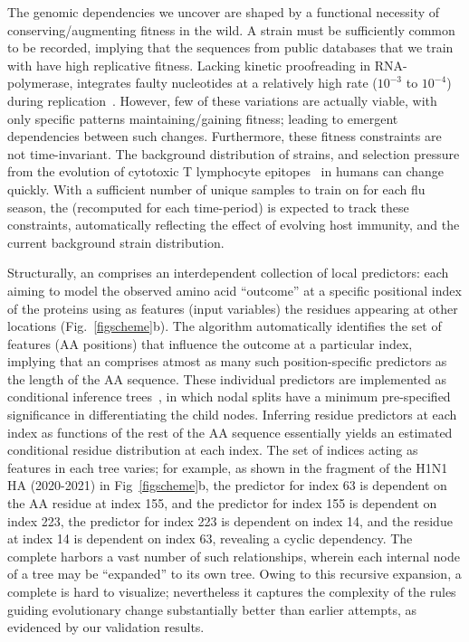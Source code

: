 \documentclass[onecolumn, compsoc,10pt]{IEEEtran}
\begin{document}
The genomic dependencies we uncover are shaped by  a  functional necessity of conserving/augmenting  fitness in the wild. A  strain must be sufficiently common  to be recorded, implying that the sequences from public databases that we train  with have  high replicative fitness. Lacking kinetic proofreading  in  RNA-polymerase,  \infl integrates  faulty nucleotides   at a relatively high rate ($10^{-3}$ to $10^{-4}$) during  replication~\cite{ahlquist2002rna,chen2006avian}. However, few   of these variations are actually viable, with only specific patterns  maintaining/gaining fitness;  leading to emergent dependencies between such changes. Furthermore, these fitness constraints are not time-invariant. The background distribution of strains, and selection pressure from the evolution of cytotoxic T lymphocyte  epitopes~\cite{woolthuis2016long,fan2012role,van2016differential,berkhoff2007assessment,van2012evasion} in humans can change quickly. With a sufficient number of unique samples to train on for each flu season, the \enet (recomputed for each time-period) is expected to  track these  constraints, automatically reflecting the effect of  evolving host immunity, and the current background strain distribution.  


Structurally, an \enet comprises an interdependent collection of  local predictors: each aiming to model the observed amino acid ``outcome'' at a specific positional index of the proteins using as features (input variables) the residues appearing  at other  locations  (Fig.~\ref{figscheme}b). The algorithm automatically identifies the set of features (AA positions) that influence the outcome at a particular index, implying that an \enet comprises atmost as many such  position-specific predictors as the length of the AA sequence. These individual predictors are implemented as conditional inference trees~\cite{Hothorn06unbiasedrecursive}, in which  nodal splits  have  a minimum pre-specified significance in differentiating the  child nodes. Inferring residue predictors at each  index as  functions of the rest of the AA sequence essentially yields an estimated conditional residue distribution  at each index. The set of indices acting as features in each tree varies; for example, as shown in the fragment of the  H1N1 HA \enet (2020-2021) in Fig~\ref{figscheme}b, the predictor for index 63 is dependent on the AA residue at index 155, and the predictor for index 155 is dependent on index 223, the predictor for index 223 is dependent on index 14, and the residue at index 14 is dependent on index 63, revealing a cyclic dependency. The complete \enet harbors a vast number of such  relationships, wherein each internal node of a tree may be  ``expanded'' to its own tree. Owing to this recursive expansion,  a complete \enet is hard to visualize; nevertheless it captures the complexity of the rules guiding evolutionary change substantially better than earlier attempts, as evidenced by our validation results.
\end{document}
